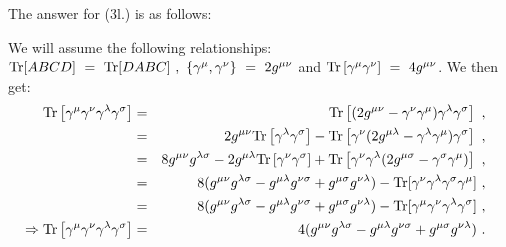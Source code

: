 \documentclass[12pt]{article}
\def \bea{\begin{eqnarray}}
\def \eea{\end{eqnarray}}
\def \[{\left[}
\def \]{\right]}
\def \Tr{{\rm Tr}}
\def \nn{\nonumber}
\def \nl{\nn \\}
\def \ga{\gamma}
\def \la{\lambda}
\def \si{\sigma}
\begin{document}
The answer for (3l.) is as follows:

We will assume the following relationships: $\Tr[ABCD] ~=~ \Tr[DABC]~,~\{\ga^\mu,\ga^\nu\}~=~2 g^{\mu\nu}$ and
$\Tr\[\ga^\mu\ga^\nu\]~=~ 4 g^{\mu\nu}$. We then get:
%
\bea
\Tr\[\ga^\mu\ga^\nu\ga^\la\ga^\si\] &=& \Tr\[(2 g^{\mu\nu}-\ga^\nu\ga^\mu)\ga^\la\ga^\si\] ~,~~ \nl
&=& 2 g^{\mu\nu}\Tr\[\ga^\la\ga^\si\] - \Tr\[\ga^\nu(2 g^{\mu\la} - \ga^\la\ga^\mu)\ga^\si\] ~,~~ \nl
&=& 8 g^{\mu\nu}g^{\la\si} - 2g^{\mu\la}\Tr\[\ga^\nu\ga^\si\] + \Tr\[\ga^\nu\ga^\la(2 g^{\mu\si} - \ga^\si\ga^\mu)\] ~,~~ \nl
&=& 8(g^{\mu\nu}g^{\la\si} - g^{\mu\la}g^{\nu\si} + g^{\mu\si}g^{\nu\la}) - \Tr[\ga^\nu\ga^\la\ga^\si\ga^\mu] ~,~~ \nl
&=& 8(g^{\mu\nu}g^{\la\si} - g^{\mu\la}g^{\nu\si} + g^{\mu\si}g^{\nu\la}) - \Tr[\ga^\mu\ga^\nu\ga^\la\ga^\si] ~,~~ \\
\Rightarrow \Tr\[\ga^\mu\ga^\nu\ga^\la\ga^\si\] &=& 4(g^{\mu\nu}g^{\la\si} - g^{\mu\la}g^{\nu\si} + g^{\mu\si}g^{\nu\la})~.~~
\eea
%
\end{document}
